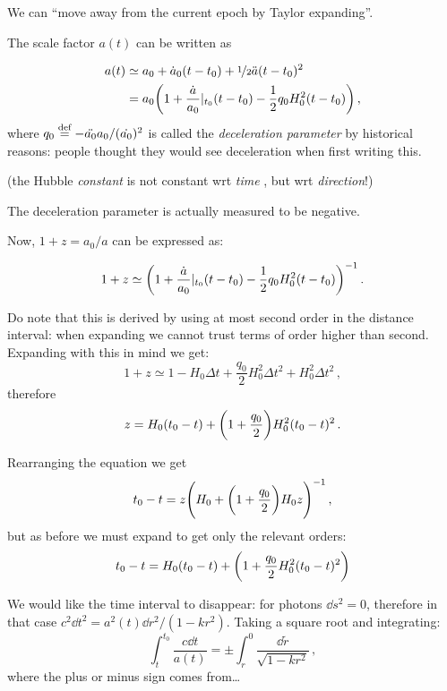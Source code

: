 \documentclass[main.tex]{subfiles}
\begin{document}
We can ``move away from the current epoch by Taylor expanding''.

The scale factor \(a(t)\) can be written as

\begin{subequations}
\begin{align}
    a(t) &\simeq a_0 + \dot{a}_0 (t-t_0 ) + \frac[i]{1}{2} \ddot{a}(t-t_0)^2\\
    &= a_0 \qty(1 + \frac{\dot{a} }{a_0}|_{t_0 } (t-t_0 ) - \frac{1}{2} q_0 H_0 ^2 (t-t_0 ))\,,
\end{align}
\end{subequations}
%
where \(q_0 \stackrel{\text{def}}{=} - \ddot{a_0 } a_0 / (\dot{a_0 } )^2\) is called the \emph{deceleration parameter} by historical reasons: people thought they would see deceleration when first writing this.

(the Hubble \emph{constant} is not constant wrt \emph{time} , but wrt \emph{direction}!)

The deceleration parameter is actually measured to be negative.

Now, \(1 + z = a_0 / a\) can be expressed as:

\begin{equation}
    1+ z \simeq \qty(1 + \frac{\dot{a} }{a_0}|_{t_0 } (t-t_0 ) - \frac{1}{2} q_0 H_0 ^2 (t-t_0 ))^{-1}\,.
\end{equation}

Do note that this is derived by using at most second order in the distance interval: when expanding we cannot trust terms of order higher than second. Expanding with this in mind we get:
%
\begin{equation}
  1+ z \simeq
  1 - H_0 \Delta t + \frac{q_0 }{2} H_0^2 \Delta t^2 + H_0^2 \Delta t^2\,,
\end{equation}
%
therefore
%
\begin{equation}
  z = H_0 (t_0 - t) + \qty(1 + \frac{q_0}{2}) H_0^2 (t_0 - t)^2\,.
\end{equation}

Rearranging the equation we get
%
\begin{equation}
  t_0 - t = z \qty(H_0 + \qty(1+\frac{q_0}{2})H_0 z)^{-1}\,,
\end{equation}
%
but as before we must expand to get only the relevant orders:
\begin{equation}
  t_0 - t = H_0 (t_0 - t) + \qty(1+ \frac{q_0}{2}H_0^2 (t_0 - t)^2)
\end{equation}

We would like the time interval to disappear: for photons \(\dd{s^2} =0\), therefore in that case \(c^2 \dd{t^2} = a^2 (t) \dd{r^2} / (1-kr^2) \). Taking a square root and integrating:
\begin{equation}
  \int_{t}^{t_0 } \frac{c \dd{t}}{a(t)}
  = \pm \int_r^0 \frac{\dd{\widetilde{r}}}{\sqrt{1-kr^2}}\,,
\end{equation}
%
where the plus or minus sign comes from\dots
\end{document}
